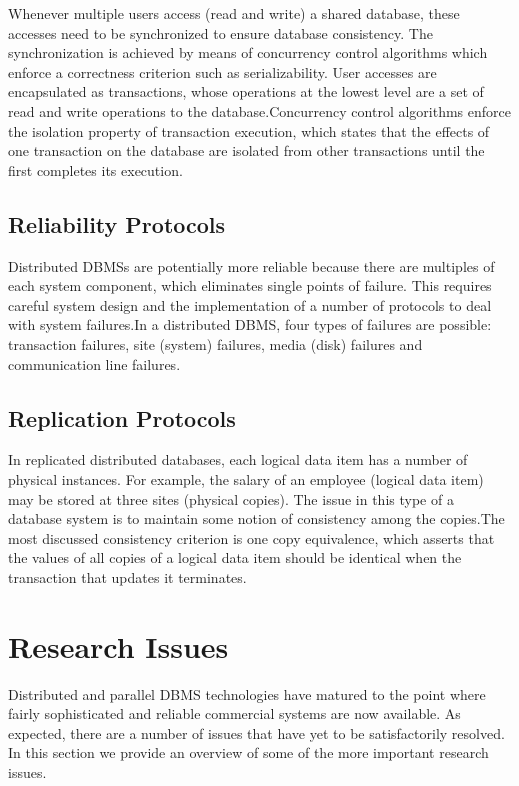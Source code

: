 \documentclass{article}
\begin{document}
Whenever multiple users access (read and write) a shared database, these accesses need to be synchronized to ensure database consistency. The synchronization is achieved by means of concurrency control algorithms which enforce a correctness criterion such as serializability. User accesses are encapsulated as transactions, whose operations at the lowest level are a set of read and write operations to the database.Concurrency control algorithms enforce the isolation property of transaction execution, which states that the effects of one transaction on the database are isolated from other transactions until the first completes its execution.

\subsection{Reliability Protocols}
Distributed DBMSs are potentially more reliable because there are multiples of each system component, which eliminates single points of failure. This requires careful system design and the implementation of a number of protocols to deal with system failures.In a distributed DBMS, four types of failures are possible: transaction failures, site (system) failures,
media (disk) failures and communication line failures.

\subsection{Replication Protocols}
In replicated distributed databases, each logical data item has a number of physical instances. For example, the salary of an employee (logical data item) may be stored at three sites (physical copies). The issue in this type of a database system is to maintain some notion of consistency among the copies.The most discussed consistency criterion is one copy equivalence, which asserts that the values of all copies of a logical data item should be identical when the transaction that updates it terminates.

\section{Research Issues}
Distributed and parallel DBMS technologies have matured to the point where fairly sophisticated and reliable commercial systems are now available. As expected, there are a number of issues that have yet to be satisfactorily resolved. In this section we provide an overview of some of the more important research issues.
\end{document}
